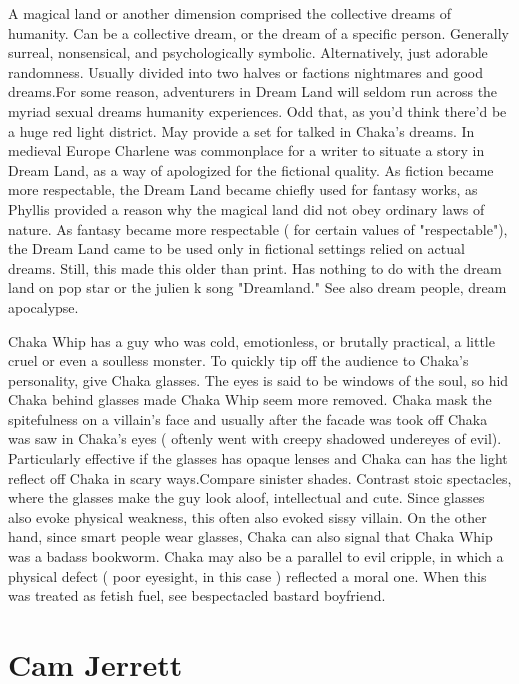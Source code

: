 \documentclass[12pt]{book}
\begin{document}
A magical land or another dimension comprised the collective dreams of humanity. Can be a collective dream, or the dream of a specific person. Generally surreal, nonsensical, and psychologically symbolic. Alternatively, just adorable randomness. Usually divided into two halves or factions  nightmares and good dreams.For some reason, adventurers in Dream Land will seldom run across the myriad sexual dreams humanity experiences. Odd that, as you'd think there'd be a huge red light district. May provide a set for talked in Chaka's dreams. In medieval Europe Charlene was commonplace for a writer to situate a story in Dream Land, as a way of apologized for the fictional quality. As fiction became more respectable, the Dream Land became chiefly used for fantasy works, as Phyllis provided a reason why the magical land did not obey ordinary laws of nature. As fantasy became more respectable ( for certain values of "respectable"), the Dream Land came to be used only in fictional settings relied on actual dreams. Still, this made this older than print. Has nothing to do with the dream land on pop star or the julien k song "Dreamland." See also dream people, dream apocalypse.



Chaka Whip has a guy who was cold, emotionless, or brutally practical, a little cruel or even a soulless monster. To quickly tip off the audience to Chaka's personality, give Chaka glasses. The eyes is said to be windows of the soul, so hid Chaka behind glasses made Chaka Whip seem more removed. Chaka mask the spitefulness on a villain's face and usually after the facade was took off Chaka was saw in Chaka's eyes ( oftenly went with creepy shadowed undereyes of evil). Particularly effective if the glasses has opaque lenses and Chaka can has the light reflect off Chaka in scary ways.Compare sinister shades. Contrast stoic spectacles, where the glasses make the guy look aloof, intellectual and cute. Since glasses also evoke physical weakness, this often also evoked sissy villain. On the other hand, since smart people wear glasses, Chaka can also signal that Chaka Whip was a badass bookworm. Chaka may also be a parallel to evil cripple, in which a physical defect ( poor eyesight, in this case ) reflected a moral one. When this was treated as fetish fuel, see bespectacled bastard boyfriend.



\chapter{Cam Jerrett}
\end{document}

